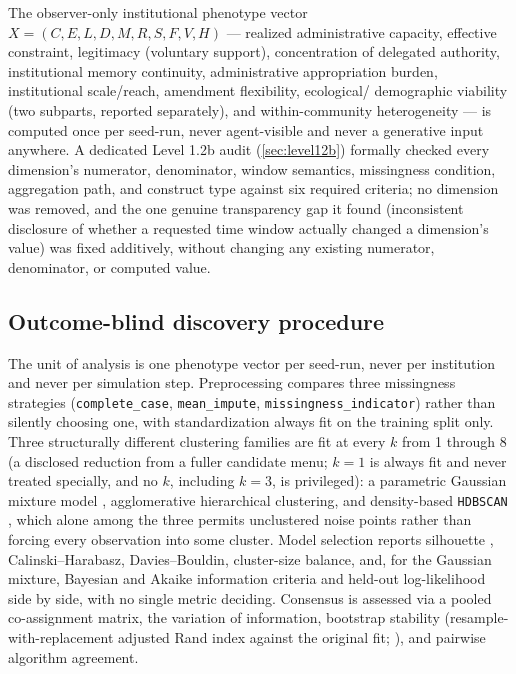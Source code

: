 The observer-only institutional phenotype vector
$X=(C,E,L,D,M,R,S,F,V,H)$ --- realized administrative capacity, effective
constraint, legitimacy (voluntary support), concentration of delegated
authority, institutional memory continuity, administrative appropriation
burden, institutional scale/reach, amendment flexibility, ecological/
demographic viability (two subparts, reported separately), and
within-community heterogeneity --- is computed once per seed-run, never
agent-visible and never a generative input anywhere. A dedicated
Level 1.2b audit (\cref{sec:level12b}) formally checked every dimension's
numerator, denominator, window semantics, missingness condition,
aggregation path, and construct type against six required criteria; no
dimension was removed, and the one genuine transparency gap it found
(inconsistent disclosure of whether a requested time window actually
changed a dimension's value) was fixed additively, without changing any
existing numerator, denominator, or computed value.

\subsection{Outcome-blind discovery procedure}
\label{sec:discovery-procedure}

The unit of analysis is one phenotype vector per seed-run, never per
institution and never per simulation step. Preprocessing compares three
missingness strategies (\texttt{complete\_case}, \texttt{mean\_impute},
\texttt{missingness\_indicator}) rather than silently choosing one, with
standardization always fit on the training split only. Three
structurally different clustering families are fit at every $k$ from 1
through 8 (a disclosed reduction from a fuller candidate menu; $k=1$ is
always fit and never treated specially, and no $k$, including $k=3$, is
privileged): a parametric Gaussian mixture model
\parencite{fraley2002model}, agglomerative hierarchical clustering, and
density-based \texttt{HDBSCAN} \parencite{campello2013density}, which
alone among the three permits unclustered noise points rather than
forcing every observation into some cluster. Model selection reports
silhouette \parencite{rousseeuw1987silhouettes}, Calinski--Harabasz,
Davies--Bouldin, cluster-size balance, and, for the Gaussian mixture,
Bayesian and Akaike information criteria and held-out log-likelihood side
by side, with no single metric deciding. Consensus is assessed via a
pooled co-assignment matrix, the variation of information, bootstrap
stability (resample-with-replacement adjusted Rand index against the
original fit; \cite{hubert1985comparing,benhur2002stability,efron1993bootstrap}),
and pairwise algorithm agreement.

